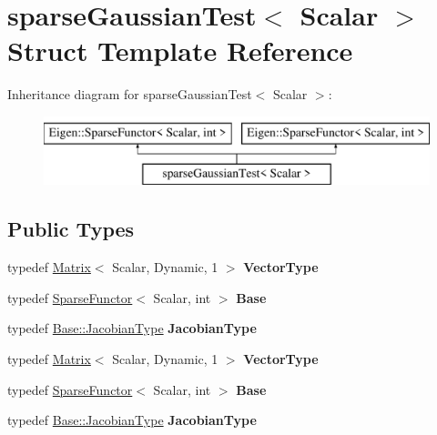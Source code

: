 \hypertarget{structsparse_gaussian_test}{}\section{sparse\+Gaussian\+Test$<$ Scalar $>$ Struct Template Reference}
\label{structsparse_gaussian_test}
Inheritance diagram for sparse\+Gaussian\+Test$<$ Scalar $>$\+:\begin{figure}[H]
\begin{center}
\leavevmode
\includegraphics[height=2.000000cm]{structsparse_gaussian_test}
\end{center}
\end{figure}
\subsection*{Public Types}
\begin{DoxyCompactItemize}
\item 
\mbox{\label{structsparse_gaussian_test_ad9cadceea18389924872602d45c10156}} 
typedef \hyperlink{group___core___module_class_eigen_1_1_matrix}{Matrix}$<$ Scalar, Dynamic, 1 $>$ {\bfseries Vector\+Type}
\item 
\mbox{\label{structsparse_gaussian_test_a20c070ebc25e66860a7f589317216c47}} 
typedef \hyperlink{struct_eigen_1_1_sparse_functor}{Sparse\+Functor}$<$ Scalar, int $>$ {\bfseries Base}
\item 
\mbox{\label{structsparse_gaussian_test_a70f401285ae4bbd10402f2bc0aa2ebfb}} 
typedef \hyperlink{group___sparse_core___module_class_eigen_1_1_sparse_matrix}{Base\+::\+Jacobian\+Type} {\bfseries Jacobian\+Type}
\item 
\mbox{\label{structsparse_gaussian_test_ad9cadceea18389924872602d45c10156}} 
typedef \hyperlink{group___core___module_class_eigen_1_1_matrix}{Matrix}$<$ Scalar, Dynamic, 1 $>$ {\bfseries Vector\+Type}
\item 
\mbox{\label{structsparse_gaussian_test_a20c070ebc25e66860a7f589317216c47}} 
typedef \hyperlink{struct_eigen_1_1_sparse_functor}{Sparse\+Functor}$<$ Scalar, int $>$ {\bfseries Base}
\item 
\mbox{\label{structsparse_gaussian_test_a70f401285ae4bbd10402f2bc0aa2ebfb}} 
typedef \hyperlink{group___sparse_core___module_class_eigen_1_1_sparse_matrix}{Base\+::\+Jacobian\+Type} {\bfseries Jacobian\+Type}
\end{DoxyCompactItemize}
